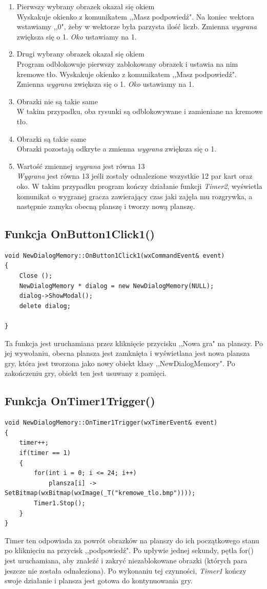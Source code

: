 \documentclass[a4paper]{article}
\begin{document}
 \begin{enumerate}
 	 \item Pierwszy wybrany obrazek okazał się okiem
\\Wyskakuje okienko z komunikatem ,,Masz podpowiedź". Na koniec wektora wstawiamy ,,0", żeby w wektorze była parzysta ilość liczb. Zmienna \emph{wygrana} zwiększa się o 1. \emph{Oko} ustawiamy na 1.

     \item Drugi wybrany obrazek okazał się okiem
\\ Program odblokowuje pierwszy zablokowany obrazek i ustawia na nim kremowe tło. Wyskakuje okienko z komunikatem ,,Masz podpowiedź". Zmienna \emph{wygrana} zwiększa się o 1. \emph{Oko} ustawiamy na 1.
     \item Obrazki nie są takie same
\\W takim przypadku, oba rysunki są odblokowywane i zamieniane na kremowe tło. 
     \item Obrazki są takie same
\\Obrazki pozostają odkryte a zmienna \emph{wygrana} zwiększa się o 1.
     \item Wartość zmiennej \emph{wygrana} jest równa 13
\\\emph{Wygrana} jest równa 13 jeśli zostały odnalezione wszystkie 12 par kart oraz oko. W takim przypadku program kończy działanie funkcji \emph{Timer2}, wyświetla komunikat o wygranej gracza zawierający czas jaki zajęła mu rozgrywka, a następnie zamyka obecną planszę i tworzy nową planszę.
 \end{enumerate}
 \subsection{Funkcja OnButton1Click1()}
\begin{verbatim}
void NewDialogMemory::OnButton1Click1(wxCommandEvent& event)
{
    Close ();
    NewDialogMemory * dialog = new NewDialogMemory(NULL);
    dialog->ShowModal();
    delete dialog;

}
\end{verbatim}
Ta funkcja jest uruchamiana przez kliknięcie przycisku ,,Nowa gra" na planszy. Po jej wywołaniu, obecna plansza jest zamknięta i wyświetlana jest nowa plansza gry, która jest tworzona jako nowy obiekt klasy ,,NewDialogMemory".  Po zakończeniu gry, obiekt ten jest usuwany z pamięci.
\subsection{Funkcja OnTimer1Trigger()}
\begin{verbatim}
void NewDialogMemory::OnTimer1Trigger(wxTimerEvent& event)
{
    timer++;
    if(timer == 1)
    {
        for(int i = 0; i <= 24; i++)
            plansza[i] -> SetBitmap(wxBitmap(wxImage(_T("kremowe_tlo.bmp"))));
        Timer1.Stop();
    }
}
\end{verbatim}
 Timer ten odpowiada za powrót obrazków na planszy do ich początkowego stanu po kliknięciu na przycisk ,,podpowiedź". Po upływie jednej sekundy, pętla for() jest uruchamiana, aby znaleźć i zakryć niezablokowane obrazki (których para jeszcze nie została odnaleziona). Po wykonaniu tej czynności, \emph{Timer1} kończy swoje działanie i plansza jest gotowa do kontynuowania gry.
\end{document}
